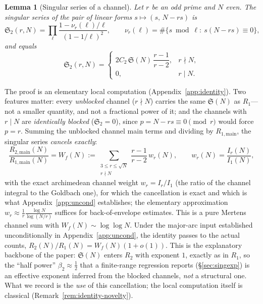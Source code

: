 \documentclass[]{interact}%
\newtheorem{lemma}{Lemma}
\newcommand{\sing}{\mathfrak S}
\begin{document}
\begin{lemma}[Singular series of a channel]\label{lem:sing}
Let $r$ be an odd prime and $N$ even. The singular series of the pair of linear forms
$s\mapsto(s,\,N-rs)$ is
\[
  \sing_2(r,N)=\prod_{\ell}\frac{1-\nu_r(\ell)/\ell}{(1-1/\ell)^2},
  \qquad \nu_r(\ell)=\#\{s\bmod\ell:\ s(N-rs)\equiv0\},
\]
and equals
\[
  \sing_2(r,N)=
  \begin{cases}
   2C_2\,\sing(N)\,\dfrac{r-1}{r-2}, & r\nmid N,\\[2mm]
   0, & r\mid N.
  \end{cases}
\]
\end{lemma}

\noindent The proof is an elementary local computation (Appendix~\ref{app:identity}). Two
features matter: every \emph{unblocked} channel ($r\nmid N$) carries the same $\sing(N)$ as
$R_1$---not a smaller quantity, and not a fractional power of it; and the channels with $r\mid N$
are \emph{identically blocked} ($\sing_2=0$), since $p=N-rs\equiv0\pmod r$ would force $p=r$.
Summing the unblocked channel main terms and dividing by $R_{1,\mathrm{main}}$, the singular
series \emph{cancels exactly}:
\begin{equation}
  \frac{R_{2,\mathrm{main}}(N)}{R_{1,\mathrm{main}}(N)}
  =W_f(N):=\sum_{\substack{3\le r\le\sqrt N\\ r\nmid N}}\frac{r-1}{r-2}\,w_r(N),
  \qquad w_r(N)=\frac{I_r(N)}{I_1(N)},
  \label{eq:Wtilde}
\end{equation}
with the exact archimedean channel weight $w_r=I_r/I_1$ (the ratio of the channel integral to
the Goldbach one), for which the cancellation is exact and which is what Appendix~\ref{app:uncond}
establishes; the elementary approximation $w_r\approx\frac1r\frac{\log N}{\log(N/r)}$ suffices for
back-of-envelope estimates. This is a pure Mertens channel sum with $W_f(N)\sim\log\log N$. Under
the major-arc input established
unconditionally in Appendix~\ref{app:uncond}, the identity passes to the actual counts,
$R_2(N)/R_1(N)=W_f(N)(1+o(1))$. This is the explanatory backbone of the paper: $\sing(N)$ enters
$R_2$ with exponent $1$, exactly as in $R_1$, so the ``half power'' $\beta_2\approx\tfrac12$ that
a finite-range regression reports (\S\ref{sec:singexp}) is an effective exponent inferred from
the blocked channels, \emph{not} a structural one. What we record is the \emph{use} of this
cancellation; the local computation itself is classical (Remark~\ref{rem:identity-novelty}).
\end{document}
